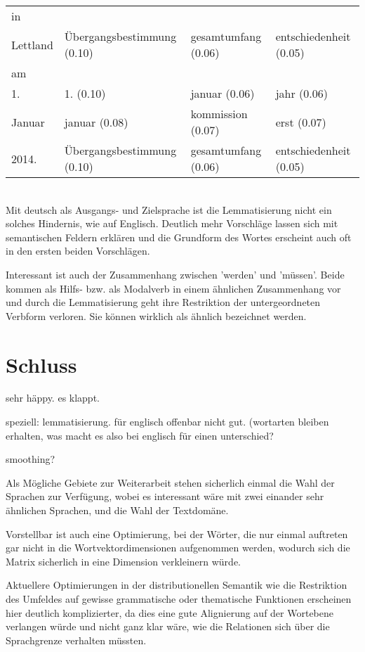 \documentclass[11pt,twoside,openright]{mpreport}
\begin{document}
\begin{footnotesize}
\begin{tabular}{|llll|}
in & & & \\
Lettland                & Übergangsbestimmung (0.10) & gesamtumfang (0.06) & entschiedenheit (0.05) \\
am & & & \\
1.                      & 1. (0.10) & januar (0.06) & jahr (0.06) \\
Januar                  & januar (0.08) & kommission (0.07) & erst (0.07) \\
2014.                   & Übergangsbestimmung (0.10) & gesamtumfang (0.06) & entschiedenheit (0.05) \\
\hline
\end{tabular}\end{footnotesize}\\

Mit deutsch als Ausgangs- und Zielsprache ist die Lemmatisierung nicht ein solches Hindernis, wie auf Englisch. Deutlich mehr Vorschläge lassen sich mit semantischen Feldern erklären und die Grundform des Wortes erscheint auch oft in den ersten beiden Vorschlägen.

Interessant ist auch der Zusammenhang zwischen 'werden' und 'müssen'. Beide kommen als Hilfs- bzw. als Modalverb in einem ähnlichen Zusammenhang vor und durch die Lemmatisierung geht ihre Restriktion der untergeordneten Verbform verloren. Sie können wirklich als ähnlich bezeichnet werden.

\chapter{Schluss}
\label{cha:schluss}

sehr häppy. es klappt. 

speziell: lemmatisierung. für englisch offenbar nicht gut. (wortarten bleiben erhalten, was macht es also bei englisch für einen unterschied?

smoothing?


Als Mögliche Gebiete zur Weiterarbeit stehen sicherlich einmal die Wahl der Sprachen zur Verfügung, wobei es interessant wäre mit zwei einander sehr ähnlichen Sprachen, und die Wahl der Textdomäne.

Vorstellbar ist auch eine Optimierung, bei der Wörter, die nur einmal auftreten gar nicht in die Wortvektordimensionen aufgenommen werden, wodurch sich die Matrix sicherlich in eine Dimension verkleinern würde.

Aktuellere Optimierungen in der distributionellen Semantik wie die Restriktion des Umfeldes auf gewisse grammatische oder thematische Funktionen erscheinen hier deutlich komplizierter, da dies eine gute Alignierung auf der Wortebene verlangen würde und nicht ganz klar wäre, wie die Relationen sich über die Sprachgrenze verhalten müssten.


\end{document}
